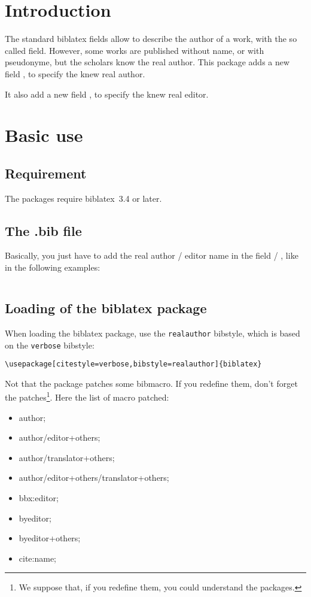\documentclass{ltxdockit}[2011/03/25]
\newcommand{\biblatex}{biblatex\xspace}
\newcommand{\namebibstyle}[1]{\texttt{#1}}
\begin{document}
\printtitlepage
\tableofcontents
\section{Introduction}

The standard biblatex fields allow to describe the author of a work, with the so called  field. However, some works are published without name, or with pseudonyme, but the scholars know the real author. This package adds a new field , to specify the knew real author.

It also add a new field , to specify the knew real editor.

\section{Basic use}

\subsection{Requirement}

The packages require \biblatex~3.4 or later.

\subsection{The .bib file}
Basically, you just have to add the real author / editor name in the field  / , like in the following examples: 

\inputminted{tex}{example-realauthor.bib}

\subsection{Loading of the \biblatex package}

When loading the \biblatex package, use the \namebibstyle{realauthor}  bibstyle, which is based on the \namebibstyle{verbose} bibstyle:

\begin{verbatim}
\usepackage[citestyle=verbose,bibstyle=realauthor]{biblatex}
\end{verbatim}

Not that the package patches some bibmacro.
If you redefine them, don't forget the patches\footnote{We suppose that, if you redefine them, you could understand the packages.}.
Here the list of macro patched:
\begin{itemize}
  \item author;
  \item author/editor+others;
  \item author/translator+others;
  \item author/editor+others/translator+others;
  \item bbx:editor;
  \item byeditor;
  \item byeditor+others;
  \item cite:name;
\end{itemize}
\end{document}
